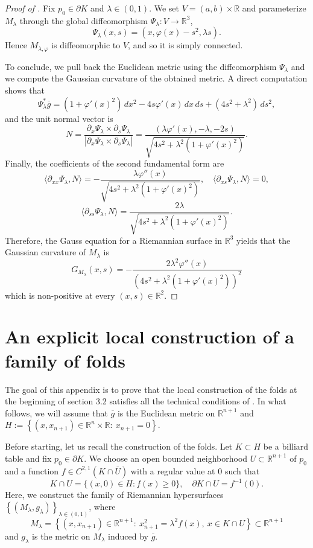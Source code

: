 \documentclass[11pt]{article}
\theoremstyle{definition}
\theoremstyle{remark}
\theoremstyle{plain}
\newcommand{\R}{\mathbb{R}}
\newcommand{\g}{\overline{g}}
\newcommand{\M}{M_\lambda}
\begin{document}
\begin{proof}[Proof of ]

Fix $p_0\in \partial K$ and $\lambda\in (0,1)$. We set $V = (a,b)\times \R$ and parameterize $\M$ through the global diffeomorphism $\Psi_\lambda:V\to \R^3$,
$$\Psi_\lambda(x,s)= \left(x,\varphi(x)-s^2,\lambda s\right).$$
Hence $M_{\lambda,\varphi}$ is diffeomorphic to $V$, and so it is simply connected.

To conclude, we pull back the Euclidean metric using the diffeomorphism $\Psi_\lambda$ and we compute the Gaussian curvature of the obtained metric. A direct computation shows that
$$\Psi_\lambda^*\g = (1+\varphi'(x)^2)\,dx^2 -4s\varphi'(x)\,dx\,ds + (4s^2+\lambda^2)\,ds^2,$$
and the unit normal vector is 
$$ N = \frac{\partial_x\Psi_\lambda\times \partial_s\Psi_\lambda} {|\partial_x\Psi_\lambda\times \partial_s\Psi_\lambda|} = \frac{(\lambda\varphi'(x),-\lambda,-2s)} {\sqrt{4s^2+\lambda^2(1+\varphi'(x)^2)}}.$$
Finally, the coefficients of the second fundamental form are
$$\langle \partial_{xx}\Psi_\lambda,N\rangle = -\frac{\lambda\varphi''(x)} {\sqrt{4s^2+\lambda^2(1+\varphi'(x)^2)}},\quad \langle \partial_{xs}\Psi_\lambda,N\rangle=0,$$
$$\langle \partial_{ss}\Psi_\lambda,N\rangle = \frac{2\lambda} {\sqrt{4s^2+\lambda^2(1+\varphi'(x)^2)}}. $$
Therefore, the Gauss equation for a Riemannian surface in $\R^3$ yields that the Gaussian curvature of $\M$ is
$$ G_{\M}(x,s)= -\frac{2\lambda^2\varphi''(x)} {(4s^2+\lambda^2(1+\varphi'(x)^2))^2}$$
which is non-positive at every $(x,s)\in \R^2$.

\end{proof}

 


\appendix

\section{An explicit local construction of a family of folds}

The goal of this appendix is to prove that the local construction of the folds at the beginning of section 3.2 satisfies all the technical conditions of . In what follows, we will assume that $\g$ is the Euclidean metric on $\R^{n+1}$ and $H:=\left\{(x,x_{n+1})\in \R^n\times \R:\ x_{n+1}=0\right\}$. 

Before starting, let us recall the construction of the folds. Let $K\subset H$ be a billiard table and fix $p_0\in \partial K$. We choose an open bounded neighborhood $U\subset \R^{n+1}$ of $p_0$ and a function $f\in C^{2,1}(K\cap\overline{U})$ with a regular value at $0$ such that
$$K\cap U =\{(x,0)\in H: f(x)\ge 0\},\quad \partial K \cap U = f^{-1}(0).$$
Here, we construct the family of Riemannian hypersurfaces $\left\{\left(\M,g_\lambda\right)\right\}_{\lambda\in (0,1)}$, where
\begin{equation*}
\M = \left\{(x,x_{n+1})\in \R^{n+1}:\ x_{n+1}^2 = \lambda^2f(x),\ x\in K\cap U\right\}\subset \R^{n+1}
\end{equation*}
and $g_\lambda$ is the metric on $\M$ induced by $\overline{g}$.
\end{document}
